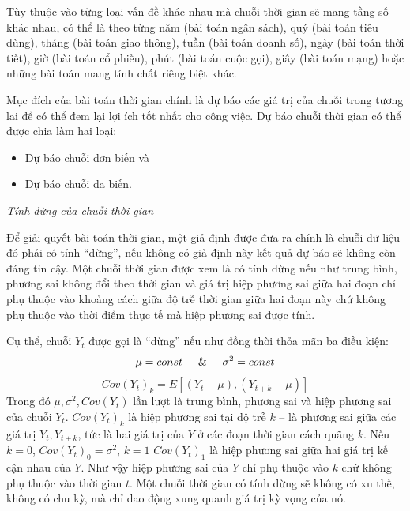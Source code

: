 \documentclass[12pt,a4paper]{report}
\begin{document}
Tùy thuộc vào từng loại vấn đề khác nhau mà chuỗi thời gian sẽ mang tầng số khác nhau, có thể là theo từng năm (bài toán ngân sách), quý (bài toán tiêu dùng), tháng (bài toán giao thông), tuần (bài toán doanh số), ngày (bài toán thời tiết), giờ (bài toán cổ phiếu), phút (bài toán cuộc gọi), giây (bài toán mạng) hoặc những bài toán mang tính chất riêng biệt khác.

Mục đích của bài toán thời gian chính là dự báo các giá trị của chuỗi trong tương lai để có thể đem lại lợi ích tốt nhất cho công việc. Dự báo chuỗi thời gian có thể được chia làm hai loại:
	\begin{itemize}
		\item Dự báo chuỗi đơn biến và
		\item Dự báo chuỗi đa biến.
	\end{itemize}

\textit{Tính dừng của chuỗi thời gian}

Để giải quyết bài toán thời gian, một giả định được đưa ra chính là chuỗi dữ liệu đó phải có tính ``dừng'', nếu không có giả định này kết quả dự báo sẽ không còn đáng tin cậy. Một chuỗi thời gian được xem là có tính dừng nếu như trung bình, phương sai không đổi theo thời gian và giá trị hiệp phương sai giữa hai đoạn chỉ phụ thuộc vào khoảng cách giữa độ trễ thời gian giữa hai đoạn này chứ không phụ thuộc vào thời điểm thực tế mà hiệp phương sai được tính.

Cụ thể, chuỗi $Y_t$ được gọi là ``dừng'' nếu như đồng thời thỏa mãn ba điều kiện:
	\begin{equation}
		\mu = const \hspace*{.5cm}\& \hspace*{.5cm}\sigma^2 = const
	\end{equation}
	\begin{equation}
		Cov(Y_t)_k = E[(Y_t - \mu), (Y_{t+k} - \mu)]
	\end{equation}
Trong đó $\mu, \sigma^2, Cov(Y_t)$ lần lượt là trung bình, phương sai và hiệp phương sai của chuỗi $Y_t$. $Cov(Y_t)_k$ là hiệp phương sai tại độ trễ $k$ -- là phương sai giữa các giá trị $Y_t, Y_{t+k}$, tức là hai giá trị của $Y$ ở các đoạn thời gian cách quãng $k$. Nếu $k = 0$, $Cov(Y_t)_0 = \sigma^2$, $k = 1$ $Cov(Y_t)_1$ là hiệp phương sai giữa hai giá trị kế cận nhau của $Y$. Như vậy hiệp phương sai của $Y$ chỉ phụ thuộc vào $k$ chứ không phụ thuộc vào thời gian $t$. Một chuỗi thời gian có tính dừng sẽ không có xu thế, không có chu kỳ, mà chỉ dao động xung quanh giá trị kỳ vọng của nó.
\end{document}
